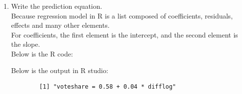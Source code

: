 \documentclass[12pt,letterpaper]{article}
\begin{document}
\begin{enumerate}
		\newpage
		
		\item Write the prediction equation. \\
		
		Because regression model in R is a list composed of coefficients, residuals, effects and many other elements. \\
		
		For coefficients, the first element is the intercept, and the second element is the slope. \\
		
		Below is the R code:
		
		
		Below is the output in R studio:
		\begin{verbatim}
		[1] "voteshare = 0.58 + 0.04 * difflog"
		\end{verbatim}
	\end{enumerate}
	
\newpage
\end{document}
